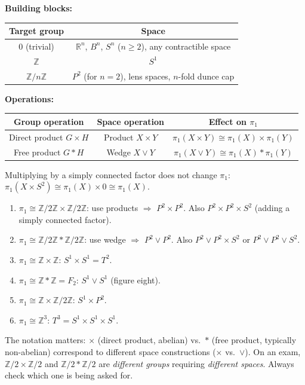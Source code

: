 \documentclass[11pt]{report}
\begin{document}
\textbf{Building blocks:}
\begin{center}
\small
\begin{tabular}{|c|c|}
\hline
\textbf{Target group} & \textbf{Space} \\
\hline
$0$ (trivial) & $\mathbb{R}^n$, $B^n$, $S^n$ ($n \geq 2$), any contractible space \\
\hline
$\mathbb{Z}$ & $S^1$ \\
\hline
$\mathbb{Z}/n\mathbb{Z}$ & $P^2$ (for $n = 2$), lens spaces, $n$-fold dunce cap \\
\hline
\end{tabular}
\end{center}

\textbf{Operations:}
\begin{center}
\small
\begin{tabular}{|c|c|c|}
\hline
\textbf{Group operation} & \textbf{Space operation} & \textbf{Effect on $\pi_1$} \\
\hline
Direct product $G \times H$ & Product $X \times Y$ & $\pi_1(X \times Y) \cong \pi_1(X) \times \pi_1(Y)$ \\
\hline
Free product $G * H$ & Wedge $X \vee Y$ & $\pi_1(X \vee Y) \cong \pi_1(X) * \pi_1(Y)$ \\
\hline
\end{tabular}
\end{center}

Multiplying by a simply connected factor does not change $\pi_1$: $\pi_1(X \times S^2) \cong \pi_1(X) \times 0 \cong \pi_1(X)$.

\begin{exbox}
\begin{enumerate}
    \item $\pi_1 \cong \mathbb{Z}/2\mathbb{Z} \times \mathbb{Z}/2\mathbb{Z}$: use products $\Rightarrow$ $P^2 \times P^2$. Also $P^2 \times P^2 \times S^2$ (adding a simply connected factor).
    \item $\pi_1 \cong \mathbb{Z}/2\mathbb{Z} * \mathbb{Z}/2\mathbb{Z}$: use wedge $\Rightarrow$ $P^2 \vee P^2$. Also $P^2 \vee P^2 \times S^2$ or $P^2 \vee P^2 \vee S^2$.
    \item $\pi_1 \cong \mathbb{Z} \times \mathbb{Z}$: $S^1 \times S^1 = T^2$.
    \item $\pi_1 \cong \mathbb{Z} * \mathbb{Z} = F_2$: $S^1 \vee S^1$ (figure eight).
    \item $\pi_1 \cong \mathbb{Z} \times \mathbb{Z}/2\mathbb{Z}$: $S^1 \times P^2$.
    \item $\pi_1 \cong \mathbb{Z}^3$: $T^3 = S^1 \times S^1 \times S^1$.
\end{enumerate}
\end{exbox}

\begin{rembox}
The notation matters: $\times$ (direct product, abelian) vs.\ $*$ (free product, typically non-abelian) correspond to different space constructions ($\times$ vs.\ $\vee$). On an exam, $\mathbb{Z}/2 \times \mathbb{Z}/2$ and $\mathbb{Z}/2 * \mathbb{Z}/2$ are \emph{different groups} requiring \emph{different spaces}. Always check which one is being asked for.
\end{rembox}
\end{document}
